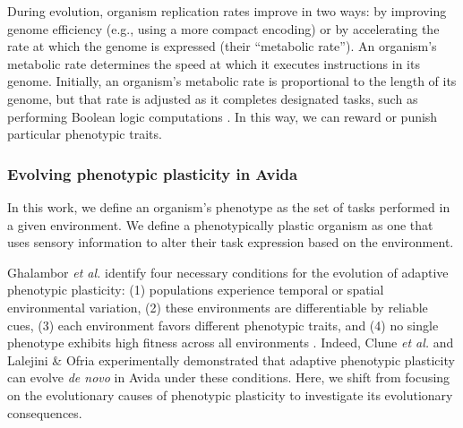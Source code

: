 
During evolution, organism replication rates improve in two ways: by improving genome efficiency (e.g., using a more compact encoding) or by accelerating the rate at which the genome is expressed (their ``metabolic rate'').
An organism's metabolic rate determines the speed at which it executes instructions in its genome.
Initially, an organism's metabolic rate is proportional to the length of its genome, but that rate is adjusted as it completes designated tasks, such as performing Boolean logic computations \citep{ofria_avida:_2009}.
In this way, we can reward or punish particular phenotypic traits. 

\vspace{1cm}
\subsubsection{Evolving phenotypic plasticity in Avida}
\label{sec:methods:evolution-of-plasticity-in-avida}


In this work, we define an organism's phenotype as the set of tasks performed in a given environment.
We define a phenotypically plastic organism as one that uses sensory information to alter their task expression based on the environment.

Ghalambor \textit{et al.} identify four necessary conditions for the evolution of adaptive phenotypic plasticity: 
(1) populations experience temporal or spatial environmental variation,
(2) these environments are differentiable by reliable cues,
(3) each environment favors different phenotypic traits,
and (4) no single phenotype exhibits high fitness across all environments \citep{ghalambor_behavior_2010}.
Indeed, Clune \textit{et al.} \citep{clune_investigating_2007} and Lalejini \& Ofria \citep{lalejini_evolutionary_2016} experimentally demonstrated that adaptive phenotypic plasticity can evolve \textit{de novo} in Avida under these conditions.
Here, we shift from focusing on the evolutionary causes of phenotypic plasticity to investigate its evolutionary consequences.

